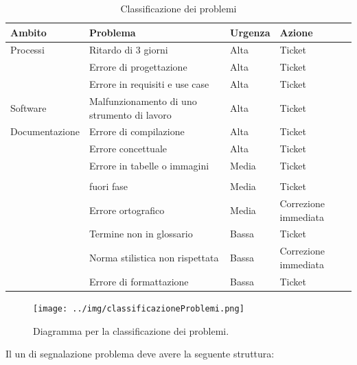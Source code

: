 \documentclass[12pt,a4paper]{article}
\begin{document}
\begin{table}[H]
	\begin{tabular}{p{} p{} p{} p{}}
		\toprule
		\textbf{Ambito}	&	\textbf{Problema}	&	\textbf{Urgenza}	&	\textbf{Azione}\\
		\midrule
		\midrule
		Processi & Ritardo di 3 giorni & Alta & Ticket \\
		\midrule
		& Errore di progettazione & Alta & Ticket \\
		\midrule
		& Errore in requisiti e use case & Alta & Ticket \\
		\midrule
		\midrule
		Software & Malfunzionamento di uno strumento di lavoro & Alta & Ticket \\
		\midrule
		\midrule
		Documentazione & Errore di compilazione & Alta & Ticket \\
		\midrule
		& Errore concettuale & Alta & Ticket \\
		\midrule
		& Errore in tabelle o immagini & Media & Ticket \\\\
		\midrule
		& \mgls{gulpease} fuori fase & Media & Ticket \\
		\midrule
		& Errore ortografico & Media & Correzione immediata \\
		\midrule
		& Termine non in glossario & Bassa & Ticket \\
		\midrule
		& Norma stilistica non rispettata & Bassa & Correzione immediata \\
		\midrule
		& Errore di formattazione & Bassa & Ticket \\
		\bottomrule
	\end{tabular}
	\caption{Classificazione dei problemi}
	\label{tabCalssificazioneProb}
\end{table}

\begin{center}
	\begin{figure}[H]
		\centering
		\label{f1-ClassificazioneProblemi}
		\texttt{[image: ../img/classificazioneProblemi.png]}
		\caption{Diagramma per la classificazione dei problemi.}
	\end{figure}
\end{center}

\label{ticketProblema}
Il un  di segnalazione problema deve avere la seguente struttura:
\end{document}
